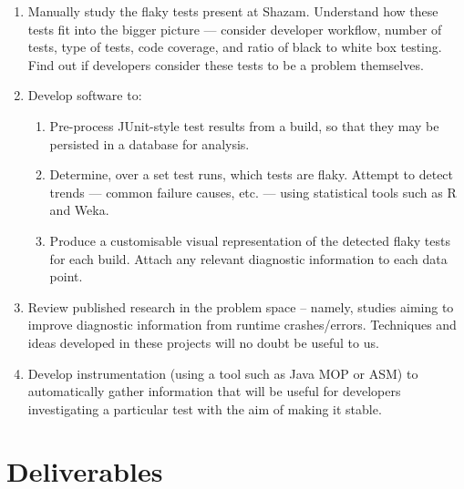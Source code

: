 \begin{enumerate}
	\item{
		Manually study the flaky tests present at Shazam. Understand how these tests fit into the bigger picture --- consider developer workflow, number of tests, type of tests, code coverage, and ratio of black to white box testing. Find out if developers consider these tests to be a problem themselves.
	}
	\item{
		Develop software to:
		\begin{enumerate}
			\item{
				Pre-process JUnit-style test results from a build, so that they may be persisted in a database for analysis.
			}
			\item{
				Determine, over a set test runs, which tests are flaky. Attempt to detect trends --- common failure causes, etc. --- using statistical tools such as R and Weka.
			}
			\item{
				Produce a customisable visual representation of the detected flaky tests for each build. Attach any relevant diagnostic information to each data point.
			}
		\end{enumerate}
	}
	\item{
		Review published research in the problem space – namely, studies aiming to improve diagnostic information from runtime crashes/errors. Techniques and ideas developed in these projects will no doubt be useful to us.
	}
	\item{
		Develop instrumentation (using a tool such as Java MOP or ASM) to automatically gather information that will be useful for developers investigating a particular test with the aim of making it stable.
	}
\end{enumerate}

\section{Deliverables}

